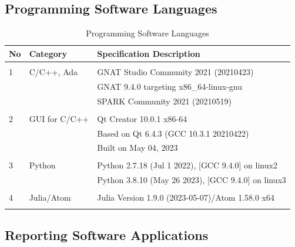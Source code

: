 
\subsection{Programming Software Languages}  
  
\begin{table}[ht]
\caption{Programming Software Languages}
\label{chap3-Programming Software Languages}

\begin{tabular}{p{0.5cm} p{4.30cm} p{9.2cm} }
\hline	
\textbf{No} & \textbf{Category}   &    \textbf{Specification Description}\\
\hline
  &                       &    \\                    
1 &	C/C++, Ada            & GNAT Studio Community 2021 (20210423) \\ 
  &                       & GNAT 9.4.0 targeting x86\_64-linux-gnu   \\  
  &                       & SPARK Community 2021 (20210519)   \\    
  &                       &    \\
2  & GUI for C/C++         & Qt Creator 10.0.1 x86-64 \\
  &                       & Based on Qt 6.4.3 (GCC 10.3.1 20210422)   \\
  &                       & Built on May 04, 2023   \\
  &                       &    \\
3 &	Python                & Python 2.7.18 (Jul 1 2022), [GCC 9.4.0] on linux2\\
  &                       & Python 3.8.10 (May 26 2023), [GCC 9.4.0] on linux3\\
  &                       &    \\
4 &	Julia/Atom            & Julia Version 1.9.0 (2023-05-07)/Atom 1.58.0 x64 \\  
  &                       & \\
\hline
\end{tabular}  
\end{table}


\clearpage
\pagebreak

\subsection{Reporting Software Applications}

